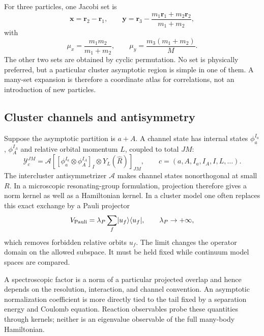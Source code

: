 For three particles, one Jacobi set is
\begin{equation}
  \bm x=\bm r_2-\bm r_1,
  \qquad
  \bm y=\bm r_3-
  \frac{m_1\bm r_1+m_2\bm r_2}{m_1+m_2},
  \label{eq:general-three-body-jacobi}
\end{equation}
with
\begin{equation}
  \mu_x=\frac{m_1m_2}{m_1+m_2},
  \qquad
  \mu_y=\frac{m_3(m_1+m_2)}{M}.
  \label{eq:general-three-body-reduced-masses}
\end{equation}
The other two sets are obtained by cyclic permutation.  No set is physically
preferred, but a particular cluster asymptotic region is simple in one of
them.  A many-set expansion is therefore a coordinate atlas for correlations,
not an introduction of new particles.

\subsection{Cluster channels and antisymmetry}
\label{subsec:cluster-channels-pauli}

Suppose the asymptotic partition is $a+A$.  A channel state has internal
states $\phi_a^{I_a}$, $\phi_A^{I_A}$ and relative orbital momentum $L$,
coupled to total $JM$:
\begin{equation}
  \mathcal Y_c^{JM}
  =\mathcal A
  \left[
   [\phi_a^{I_a}\otimes\phi_A^{I_A}]_I
   \otimes Y_L(\hat R)
  \right]_{JM},
  \qquad c=(a,A,I_a,I_A,I,L,\ldots).
  \label{eq:nuclear-channel-state}
\end{equation}
The intercluster antisymmetrizer $\mathcal A$ makes channel states nonorthogonal
at small $R$.  In a microscopic resonating-group formulation, projection
therefore gives a norm kernel as well as a Hamiltonian kernel.  In a cluster
model one often replaces this exact exchange by a Pauli projector
\begin{equation}
  V_{\mathrm{Pauli}}=\lambda_P
  \sum_f\lvert u_f \rangle\langle u_f \rvert,
  \qquad \lambda_P\to+\infty,
  \label{eq:orthogonality-condition-model}
\end{equation}
which removes forbidden relative orbits $u_f$.  The limit changes the operator
domain on the allowed subspace.  It must be held fixed while continuum model
spaces are compared.

A spectroscopic factor is a norm of a particular projected overlap and hence
depends on the resolution, interaction, and channel convention.  An
asymptotic normalization coefficient is more directly tied to the tail fixed
by a separation energy and Coulomb equation.  Reaction observables probe
these quantities through kernels; neither is an eigenvalue observable of the
full many-body Hamiltonian.

